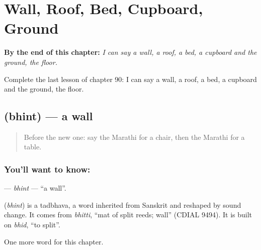
\chapter{Wall, Roof, Bed, Cupboard, Ground}
\label{ch:mr-wall-roof-bed-cupboard-ground}

\begin{chapteropening}
\textbf{By the end of this chapter:} \emph{I can say a wall, a roof, a bed, a cupboard and the ground, the floor.}

Complete the last lesson of chapter 90: I can say a wall, a roof, a bed, a cupboard and the ground, the floor.
\end{chapteropening}

\section[\texorpdfstring{\mr{भिंत} (bhint)}{भिंत (bhint)}]{ (bhint) — a wall}

\label{lesson:MR-C90-bhint}



\begin{quote}
Before the new one: say the Marathi for a chair, then the Marathi for a table.
\end{quote}

\subsection*{You'll want to know: }
\textbf{} — \emph{bhint} — \textquotedblleft{}a wall\textquotedblright{}.

\begin{cousinweb}
\textbf{} (\emph{bhint}) is a tadbhava, a word inherited from Sanskrit and reshaped by sound change. It comes from \emph{bhitti}, \textquotedblleft{}mat of split reeds; wall\textquotedblright{} (CDIAL 9494). It is built on \emph{bhid}, \textquotedblleft{}to split\textquotedblright{}.
\end{cousinweb}

\begin{grammarlens}[title={What you've built}]
One more word for this chapter.
\end{grammarlens}


